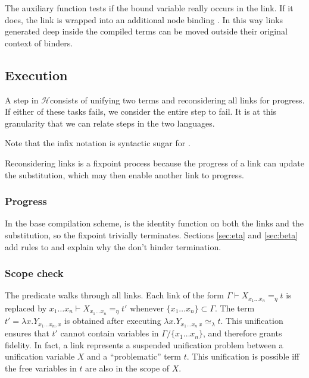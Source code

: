 \documentclass[sigconf,natbib=false,review]{acmart}
\newcommand{\UnifRel}{\ensuremath{\simeq}}
\newcommand{\Ue}{\ensuremath{\UnifRel_\lambda}\xspace}
\newcommand{\Ho}{\texorpdfstring{\ensuremath{\mathcal{H}}\xspace}{H}}
\newcommand{\linketaM}[3]{\ensuremath{#1 \vdash #2 =_\eta #3}}
\newcommand{\linkStore}{\texorpdfstring{\ensuremath{\mathbb{L}}\xspace}{L}}
\begin{document}
The auxiliary function  tests if the bound variable
 really occurs in the link. If it does, the link is wrapped into
an additional  node binding . In this way links generated
deep inside the compiled terms can be moved outside their original context
of binders.




\subsection{Execution}
\label{sec:execution}

A step in \Ho consists of unifying two terms and reconsidering all
links for progress. If either of these tasks fails, we consider the entire step to
fail. It is at this granularity that we can relate steps in the
two languages.




\noindent
Note that the infix notation \elpiIn{((A ~\Ue~B) C D)} is syntactic sugar for
\elpiIn{((~\Ue\!\!\!~) A B C D)}.

Reconsidering links is a fixpoint process because the progress of a link
can update the substitution, which may then enable another link to progress.



\subsubsection{Progress}
In the base compilation scheme,  is the identity function
on both the links and the substitution, so the fixpoint trivially terminates.
Sections \ref{sec:eta} and \ref{sec:beta} add rules to 
and explain why the don't hinder termination.

\subsubsection{Scope check}\label{sec:sc}
The predicate  walks through all links. 
Each link of the form \linketaM{\Gamma}{X_{x_1\ldots x_n}}{t} is replaced by
\linketaM{{x_1\ldots x_n}}{X_{x_1\ldots x_n}}{t'} whenever $\{x_1\ldots x_n\} \subset \Gamma$.
The term $t' = \lambda x.Y_{{x_1\ldots x_n},x}$ is obtained after
executing $\lambda x.Y_{{x_1\ldots x_n}~x} \Ue t$. This unification
ensures that $t'$ cannot contain variables in $\Gamma / \{x_1\ldots x_n\}$,
and therefore grants fidelity.
In fact, a link represents a suspended unification problem between a unification variable $X$
and a ``problematic'' term $t$. This unification is possible iff 
the free variables in $t$ are also in the scope of $X$.
\end{document}
